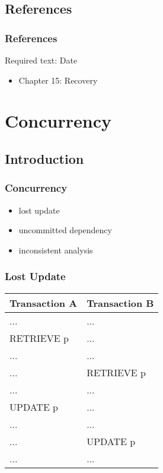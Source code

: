 \documentclass[dvipsnames]{beamer}
\theoremstyle{plain}
\begin{document}
\subsection*{References}

\begin{frame}
  \frametitle{References}

  \begin{block}{Required text: Date}
    \begin{itemize}
      \item Chapter 15: \alert{Recovery}
    \end{itemize}
  \end{block}
\end{frame}

\section{Concurrency}

\subsection{Introduction}

\begin{frame}
  \frametitle{Concurrency}

  \begin{itemize}
    \item lost update
    \item uncommitted dependency
    \item inconsistent analysis
  \end{itemize}
\end{frame}

\begin{frame}[fragile]
  \frametitle{Lost Update}

  \begin{example}
    \begin{table}
      \begin{tabular}{ll}
Transaction A & Transaction B\\\hline
...           & ...          \\\pause
RETRIEVE p    & ...          \\\pause
...           & ...          \\
...           & RETRIEVE p   \\\pause
...           & ...          \\
UPDATE p      & ...          \\\pause
...           & ...          \\
...           & UPDATE p     \\
...           & ...
      \end{tabular}
    \end{table}
  \end{example}
\end{frame}
\end{document}
